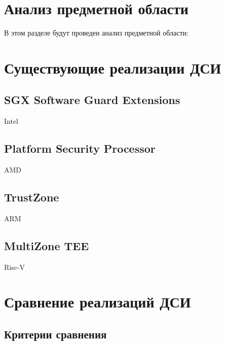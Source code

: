 \section{Анализ предметной области}

В этом разделе будут проведен анализ предметной области: 

\section{Существующие реализации ДСИ}

\subsection{SGX Software Guard Extensions}

Intel

\subsection{Platform Security Processor}

AMD

\subsection{TrustZone}

ARM

\subsection{MultiZone TEE}

Risc-V

\section{Сравнение реализаций ДСИ}

\subsection{Критерии сравнения}

\pagebreak
